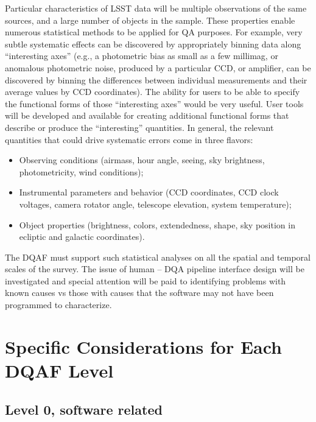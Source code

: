 \documentclass[SE,toc,lsstdraft]{lsstdoc}
\newcommand{\newtext}[1]{{\color{blue} #1}}
\begin{document}
Particular characteristics of LSST data will be multiple observations of the same sources, and a large
number of objects in the sample. These properties enable numerous statistical methods to be applied
for QA purposes. For example, very subtle systematic effects can be discovered by appropriately binning
data along ``interesting axes''  (e.g., a photometric bias as small as a few millimag, or anomalous
photometric noise, produced by a particular CCD, or amplifier, can be discovered by binning the differences
between individual measurements and their average values by CCD coordinates).  The ability for users to be able to specify the functional forms of those ``interesting axes'' would be very useful.   User tools will be developed and available for creating additional functional forms that describe or produce the ``interesting'' quantities.  In general, the relevant
quantities that could drive systematic errors come in three flavors:
\begin{itemize}
\item Observing conditions (airmass, hour angle, seeing, sky brightness, photometricity, wind conditions);
\item Instrumental parameters and behavior (CCD coordinates, \newtext{CCD clock voltages,} camera rotator angle, telescope elevation, system
         temperature);
\item Object properties (brightness, colors, extendedness, \newtext{shape,} sky position in ecliptic and galactic coordinates).
\end{itemize}


The DQAF must support such statistical analyses on all the spatial and temporal scales of the survey. The issue of human – DQA pipeline interface design will be investigated and special attention will be paid to identifying problems with known causes vs those with causes that the software may not have been programmed to characterize.




\section{Specific Considerations for Each DQAF Level}


\subsection{Level 0, software related}
\end{document}
